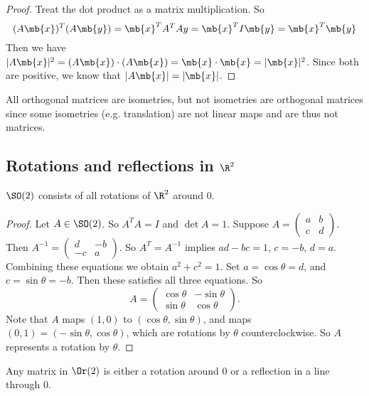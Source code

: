 \documentclass[a4pape]{article}
\begin{document}
\begin{proof}
  Treat the dot product as a matrix multiplication. So
  \[
  (A\mb{x})^T(A\mb{y}) = \mb{x}^{T}A^TAy = \mb{x}^TI\mb{y} = \mb{x}^T\mb{y}
  \]
  Then we have $|A\mb{x}|^2 = (A\mb{x})\cdot (A\mb{x}) = \mb{x}\cdot \mb{x} = |\mb{x}|^2$. Since both are positive, we know that $|A\mb{x}| = |\mb{x}|$.
\end{proof}
\note All orthogonal matrices are isometries, but not isometries are orthogonal matrices since some isometries (e.g. translation) are not linear maps and are thus not matrices.
\subsection{Rotations and reflections in \texorpdfstring{$\R^2$}{R2}}
\begin{lemma}
  $\SO(2)$ consists of all rotations of $\R^2$ around 0.
\end{lemma}

\begin{proof}
  Let $A\in \SO(2)$. So $A^TA = I$ and $\det A = 1$. Suppose $A = 
  \begin{pmatrix}
    a & b\\c & d
  \end{pmatrix}$. Then $A^{-1} = 
  \begin{pmatrix}
    d & -b\\-c & a
  \end{pmatrix}.$ So $A^T = A^{-1}$ implies $ad - bc = 1$, $c = -b$, $d = a$. Combining these equations we obtain $a^2 + c^2 = 1$. Set $a = \cos\theta = d$, and $c = \sin\theta = -b$. Then these satisfies all three equations. So
  \[
  A = 
  \begin{pmatrix}
    \cos\theta & -\sin\theta\\
    \sin\theta & \cos\theta
  \end{pmatrix}.
  \]
  Note that $A$ maps $(1, 0)$ to $(\cos\theta, \sin \theta)$, and maps $(0, 1)= (-\sin\theta, \cos\theta)$, which are rotations by $\theta$ counterclockwise. So $A$ represents a rotation by $\theta$.
\end{proof}

\begin{cor}
  Any matrix in $\Or(2)$ is either a rotation around $0$ or a reflection in a line through $0$.
\end{cor}
\end{document}
